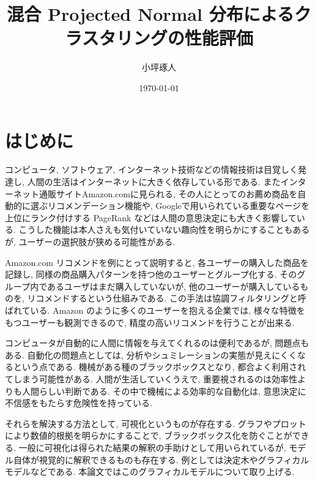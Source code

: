 \documentclass[a4paper]{jarticle}
\title{混合 Projected Normal 分布によるクラスタリングの性能評価}   %
\author{小坪琢人}   %
\date{\today}   %
\begin{document}


\maketitle   %
\setlength{\baselineskip}{20pt}   %
\tableofcontents   %
\listoffigures   %
\listoftables   %
\clearpage   %


\section{はじめに}

コンピュータ, ソフトウェア, インターネット技術などの情報技術は目覚しく発達し, 人間の生活はインターネットに大きく依存している形である. またインターネット通販サイトAmazon.comに見られる, その人にとってのお薦め商品を自動的に選ぶリコメンデーション機能や, Googleで用いられている重要なページを上位にランク付けする PageRank などは人間の意思決定にも大きく影響している. こうした機能は本人さえも気付いていない趣向性を明らかにすることもあるが, ユーザーの選択肢が狭める可能性がある.

Amazon.com リコメンドを例にとって説明すると, 各ユーザーの購入した商品を記録し, 同様の商品購入パターンを持つ他のユーザーとグループ化する. そのグループ内であるユーザはまだ購入していないが, 他のユーザーが購入しているものを, リコメンドするという仕組みである. この手法は協調フィルタリングと呼ばれている. Amazon のように多くのユーザーを抱える企業では, 様々な特徴をもつユーザーも観測できるので, 精度の高いリコメンドを行うことが出来る.

コンピュータが自動的に人間に情報を与えてくれるのは便利であるが, 問題点もある. 自動化の問題点としては, 分析やシュミレーションの実態が見えにくくなるという点である. 機械がある種のブラックボックスとなり, 都合よく利用されてしまう可能性がある. 人間が生活していくうえで, 重要視されるのは効率性よりも人間らしい判断である. その中で機械による効率的な自動化は, 意思決定に不信感をもたらす危険性を持っている.

それらを解決する方法として, 可視化というものが存在する. グラフやプロットにより数値的根拠を明らかにすることで, ブラックボックス化を防ぐことができる. 一般に可視化は得られた結果の解釈の手助けとして用いられているが, モデル自体が視覚的に解釈できるものも存在する. 例としては決定木やグラフィカルモデルなどである. 本論文ではこのグラフィカルモデルについて取り上げる. 
\end{document}
